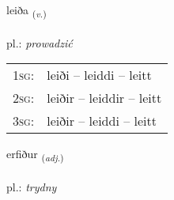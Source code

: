\documentclass[frontgrid, backgrid]{flacards}\usepackage[]{graphicx}\usepackage[]{xcolor}
\begin{document}
\renewcommand{\flhead}{\vskip5pt \fboxsep=0pt {\small\bfseries\footnotesize Sagnorð | Verb}}
\renewcommand{\fcfoot}{\vskip5pt \fboxsep=0pt \hspace{2pt}{\small\bfseries\footnotesize 1K}}

\renewcommand{\blhead}{\vskip5pt {\small\bfseries\footnotesize Sagnorð | Verb }}
\renewcommand{\bcfoot}{\vskip5pt \hspace{2pt}{\small\bfseries\footnotesize 1K}}


{leiða \small{\textsubscript{(\textit{v.})}} \\[1ex] %
\textphonetic{[leiːða]} \\
pl.: \emph{prowadzić} \\  [2ex]
\renewcommand*{\arraystretch}{0.8}
\begin{tabular}{p{1cm}l}
\textsc{1sg}: & leiði -- leiddi -- leitt \\ 
\textsc{2sg}: & leiðir -- leiddir -- leitt \\ 
\textsc{3sg}: & leiðir -- leiddi -- leitt \\ 
\end{tabular}
}

\renewcommand{\flhead}{\vskip5pt \fboxsep=0pt {\small\bfseries\footnotesize Lýsingarorð | Adjective}}
\renewcommand{\fcfoot}{\vskip5pt \fboxsep=0pt \hspace{2pt}{\small\bfseries\footnotesize 1K}}

\renewcommand{\blhead}{\vskip5pt {\small\bfseries\footnotesize Lýsingarorð | Adjective }}
\renewcommand{\bcfoot}{\vskip5pt \hspace{2pt}{\small\bfseries\footnotesize 1K}}


{erfiður \small{\textsubscript{(\textit{adj.})}} \\[1ex] %
\textphonetic{[ɛrvɪðʏr]} \\
pl.: \emph{trydny} \\  [2ex]
\renewcommand*{\arraystretch}{0.8}
}
\end{document}
